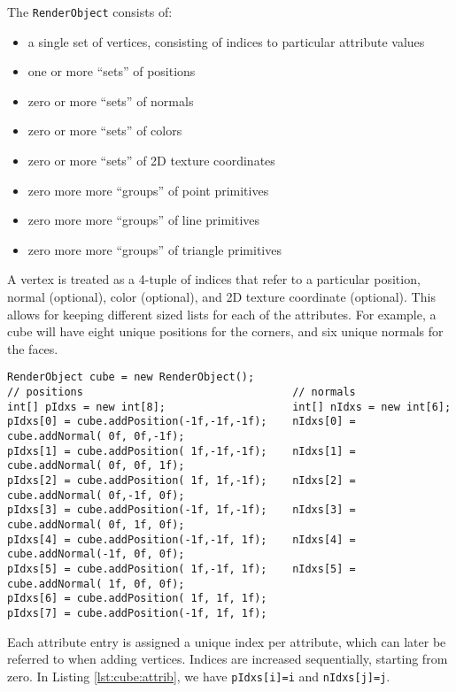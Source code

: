\documentclass{article}
\newenvironment{tightemize}{\begin{itemize}[nolistsep,noitemsep]}{\end{itemize}}
\begin{document}
The \lstinline{RenderObject} consists of:
\begin{tightemize}
   \item a single set of vertices, consisting of indices to particular attribute values
   \item one or more ``sets'' of positions
   \item zero or more ``sets'' of normals
   \item zero or more ``sets'' of colors
   \item zero or more ``sets'' of 2D texture coordinates
   \item zero more more ``groups'' of point primitives
   \item zero more more ``groups'' of line primitives
   \item zero more more ``groups'' of triangle primitives
\end{tightemize}
A vertex is treated as a 4-tuple of indices that refer to a particular position, normal (optional),
color (optional), and 2D texture coordinate (optional).  This allows for keeping different sized
lists for each of the attributes.  For example, a cube will have eight unique positions for the 
corners, and six unique normals for the faces.  
\begin{lstlisting}[caption=Adding attributes to make a cube,label=lst:cube:attrib]
RenderObject cube = new RenderObject();
// positions                                 // normals
int[] pIdxs = new int[8];                    int[] nIdxs = new int[6];
pIdxs[0] = cube.addPosition(-1f,-1f,-1f);    nIdxs[0] = cube.addNormal( 0f, 0f,-1f);
pIdxs[1] = cube.addPosition( 1f,-1f,-1f);    nIdxs[1] = cube.addNormal( 0f, 0f, 1f);
pIdxs[2] = cube.addPosition( 1f, 1f,-1f);    nIdxs[2] = cube.addNormal( 0f,-1f, 0f);
pIdxs[3] = cube.addPosition(-1f, 1f,-1f);    nIdxs[3] = cube.addNormal( 0f, 1f, 0f);
pIdxs[4] = cube.addPosition(-1f,-1f, 1f);    nIdxs[4] = cube.addNormal(-1f, 0f, 0f);
pIdxs[5] = cube.addPosition( 1f,-1f, 1f);    nIdxs[5] = cube.addNormal( 1f, 0f, 0f);
pIdxs[6] = cube.addPosition( 1f, 1f, 1f);
pIdxs[7] = cube.addPosition(-1f, 1f, 1f);
\end{lstlisting}
Each attribute entry is assigned a unique index per attribute, which can later be referred to 
when adding vertices.  Indices are increased sequentially, starting from zero.  In 
Listing \ref{lst:cube:attrib}, we have \lstinline{pIdxs[i]=i} and \lstinline{nIdxs[j]=j}.
\end{document}
